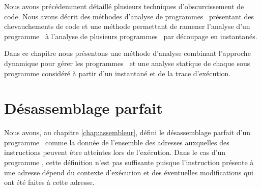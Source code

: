 


Nous avons précédemment détaillé plusieurs techniques d'obscurcissement de code. 
Nous avons décrit des méthodes d'analyse de programmes \nsm\ présentant des chevauchements de code et une méthode permettant de ramener l'analyse d'un programme \sm\ à l'analyse de plusieurs programmes \nsms\ par découpage en instantanés.

Dans ce chapitre nous présentons une méthode d'analyse combinant l'approche dynamique pour gérer les programmes \sms\ et une analyse statique de chaque sous programme considéré à partir d'un instantané et de la trace d'exécution.

\section{Désassemblage parfait}
Nous avons, au chapitre \ref{chap:assembleur}, défini le désassemblage parfait d'un programme \nsm\ comme la donnée de l'ensemble des adresses auxquelles des instructions peuvent être atteintes lors de l'exécution.
Dans le cas d'un programme \sm, cette définition n'est pas suffisante puisque l'instruction présente à une adresse dépend du contexte d'exécution et des éventuelles modifications qui ont été faites à cette adresse.

